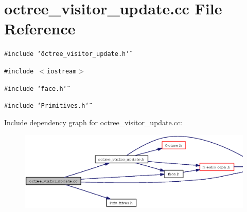 \section{octree\_\-visitor\_\-update.cc File Reference}
\label{octree__visitor__update_8cc}
{\tt \#include \char`\"{}octree\_\-visitor\_\-update.h\char`\"{}}\par
{\tt \#include $<$iostream$>$}\par
{\tt \#include \char`\"{}face.h\char`\"{}}\par
{\tt \#include \char`\"{}Primitives.h\char`\"{}}\par


Include dependency graph for octree\_\-visitor\_\-update.cc:\begin{figure}[H]
\begin{center}
\leavevmode
\includegraphics[width=337pt]{octree__visitor__update_8cc__incl}
\end{center}
\end{figure}
